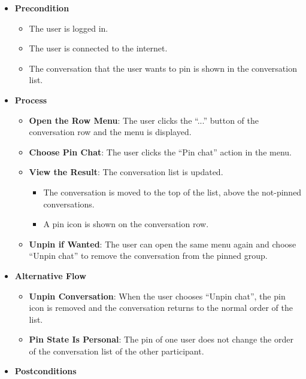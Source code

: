 \begin{itemize}[leftmargin=1.6em,topsep=4pt,itemsep=3pt,parsep=0pt,label=$\bullet$]
    \item \textbf{Precondition}

        \begin{itemize}[leftmargin=2.2em,topsep=2pt,itemsep=3pt,parsep=0pt,label=$\circ$]
            \item The user is logged in.
            \item The user is connected to the internet.
            \item The conversation that the user wants to pin is shown in the conversation list.
        \end{itemize}
    \item \textbf{Process}

        \begin{itemize}[leftmargin=2.2em,topsep=2pt,itemsep=3pt,parsep=0pt,label=$\circ$]
            \item \textbf{Open the Row Menu}: The user clicks the ``...'' button of the conversation row and the menu is displayed.
            \item \textbf{Choose Pin Chat}: The user clicks the ``Pin chat'' action in the menu.
            \item \textbf{View the Result}: The conversation list is updated.
                \begin{itemize}[leftmargin=2.2em,topsep=2pt,itemsep=3pt,parsep=0pt,label=$\blacksquare$]
                    \item The conversation is moved to the top of the list, above the not-pinned conversations.
                    \item A pin icon is shown on the conversation row.
                \end{itemize}
            \item \textbf{Unpin if Wanted}: The user can open the same menu again and choose ``Unpin chat'' to remove the conversation from the pinned group.
        \end{itemize}
    \item \textbf{Alternative Flow}

        \begin{itemize}[leftmargin=2.2em,topsep=2pt,itemsep=3pt,parsep=0pt,label=$\circ$]
            \item \textbf{Unpin Conversation}: When the user chooses ``Unpin chat'', the pin icon is removed and the conversation returns to the normal order of the list.
            \item \textbf{Pin State Is Personal}: The pin of one user does not change the order of the conversation list of the other participant.
        \end{itemize}
    \item \textbf{Postconditions}


\end{itemize}
